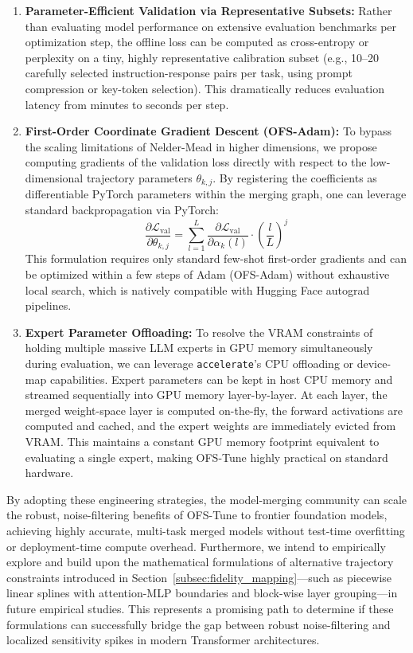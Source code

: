 \begin{enumerate}
    \item \textbf{Parameter-Efficient Validation via Representative Subsets:} 
    Rather than evaluating model performance on extensive evaluation benchmarks
    per optimization step, the offline loss can be computed as cross-entropy or
    perplexity on a tiny, highly representative calibration subset (e.g., 10--20
    carefully selected instruction-response pairs per task, using prompt
    compression or key-token selection).
This dramatically reduces evaluation
    latency from minutes to seconds per step.
    \item \textbf{First-Order Coordinate Gradient Descent (OFS-Adam):} 
    To bypass the scaling limitations of Nelder-Mead in higher dimensions, we
    propose computing gradients of the validation loss directly with respect to
    the low-dimensional trajectory parameters $\theta_{k, j}$.
By registering
    the coefficients as differentiable PyTorch parameters within the merging
    graph, one can leverage standard backpropagation via PyTorch:
    \begin{equation}
    \label{eq:grad_ofs}
    \frac{\partial \mathcal{L}_{\text{val}}}{\partial \theta_{k, j}} = 
    \sum_{l=1}^L \frac{\partial \mathcal{L}_{\text{val}}}{\partial \alpha_k(l)} 
    \cdot \left( \frac{l}{L} \right)^j
    \end{equation}
    This formulation requires only standard few-shot first-order gradients and
    can be optimized within a few steps of Adam (OFS-Adam) without exhaustive
    local search, which is natively compatible with Hugging Face autograd
    pipelines.
    \item \textbf{Expert Parameter Offloading:} 
    To resolve the VRAM constraints of holding multiple massive LLM experts
    in GPU memory simultaneously during evaluation, we can leverage
    \texttt{accelerate}'s CPU offloading or device-map capabilities.
Expert
    parameters can be kept in host CPU memory and streamed sequentially into GPU
    memory layer-by-layer.
At each layer, the merged weight-space layer is
    computed on-the-fly, the forward activations are computed and cached, and the
    expert weights are immediately evicted from VRAM.
This maintains a constant GPU
    memory footprint equivalent to evaluating a single expert, making OFS-Tune
    highly practical on standard hardware.
\end{enumerate}
By adopting these engineering strategies, the model-merging community can scale
the robust, noise-filtering benefits of OFS-Tune to frontier foundation models,
achieving highly accurate, multi-task merged models without test-time
overfitting or deployment-time compute overhead.
Furthermore, we intend to empirically explore and build upon the mathematical formulations of alternative trajectory constraints introduced in Section~\ref{subsec:fidelity_mapping}---such as piecewise linear splines with attention-MLP boundaries and block-wise layer grouping---in future empirical studies.
This represents a promising path to determine if these formulations can successfully bridge the gap between robust noise-filtering and localized sensitivity spikes in modern Transformer architectures.
